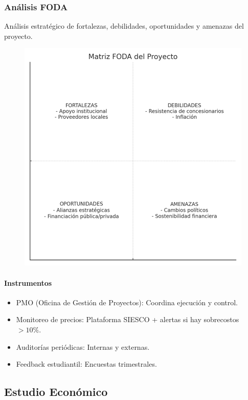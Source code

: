 \documentclass[letterpaper, 11pt]{report}
\begin{document}
\subsubsection{Análisis FODA}
Análisis estratégico de fortalezas, debilidades, oportunidades y amenazas del proyecto.

\begin{figure}[H]
      \centering
      \includegraphics[width=\textwidth]{Images/foda.png}
\end{figure}

\paragraph{Instrumentos}
\begin{itemize}
      \item PMO (Oficina de Gestión de Proyectos): Coordina ejecución y control.
      \item Monitoreo de precios: Plataforma SIESCO + alertas si hay sobrecostos $>10\%$.
      \item Auditorías periódicas: Internas y externas.
      \item Feedback estudiantil: Encuestas trimestrales.
\end{itemize}

\subsection{Estudio Económico}
\end{document}
